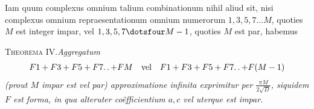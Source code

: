 Iam quum complexus omnium talium combinationum nihil aliud sit, nisi complexus omnium repraesentationum omnium numerorum $1,3,5,7\ldots M$, quoties $M$ est integer impar, vel $1,3,5,7\dotsfour M-1$, quoties $M$ est par, habemus

\textsc{Theorema IV.}\quad\emph{Aggregatum}
\[
F1+F3+F5+F7\ldotp\ldotp+FM\quad\text{vel}\quad F1+F3+F5+F7\ldotp\ldotp+F(M-1)
\]
\emph{(prout $M$ impar est vel par) approximatione infinita exprimitur per $\frac{\pi M}{2\surd D}$, siquidem $F$ est forma, in qua alteruter coëfficientium $a,c$ vel uterque est impar.}
